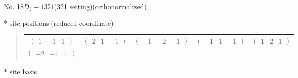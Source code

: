 \documentclass[fleqn,9pt,landscape]{jsarticle}
\begin{document}
\newpage
\begin{center}
\LARGE
No. 18\quad$D_{3}-1$\quad$321$\quad(321 setting)\quad[ trigonal ] (orthonormalized)
\end{center}
\vspace{5mm}
* site positions (reduced coordinate)
\begin{quote}
\begin{tabular}{ccccc}
$ \begin{pmatrix} 1 & -1 & 1 \end{pmatrix} $ & $ \begin{pmatrix} 2 & 1 & -1 \end{pmatrix} $ & $ \begin{pmatrix} -1 & -2 & -1 \end{pmatrix} $ & $ \begin{pmatrix} -1 & 1 & -1 \end{pmatrix} $ & $ \begin{pmatrix} 1 & 2 & 1 \end{pmatrix} $ \\
$ \begin{pmatrix} -2 & -1 & 1 \end{pmatrix} $ & $  $ & $  $ & $  $ & $  $
\end{tabular}
\end{quote}
* site basis
\end{document}
